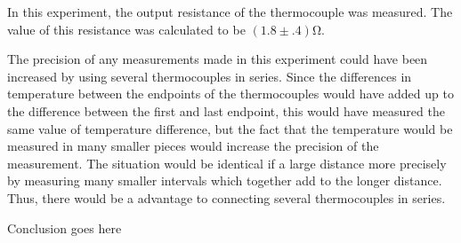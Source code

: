 \begin{paper}
	
	In this experiment, the output resistance of the thermocouple was measured.
	The value of this resistance was calculated to be $(1.8\pm.4)\si{\ohm}$.

	The precision of any measurements made in this experiment could have been increased by using several thermocouples in series.
	Since the differences in temperature between the endpoints of the thermocouples would have added up to the difference between the first and last endpoint, this would have measured the same value of temperature difference, but the fact that the temperature would be measured in many smaller pieces would increase the precision of the measurement.
	The situation would be identical if a large distance more precisely by measuring many smaller intervals which together add to the longer distance.
	Thus, there would be a advantage to connecting several thermocouples in series.
	

	Conclusion goes here



\end{paper}

